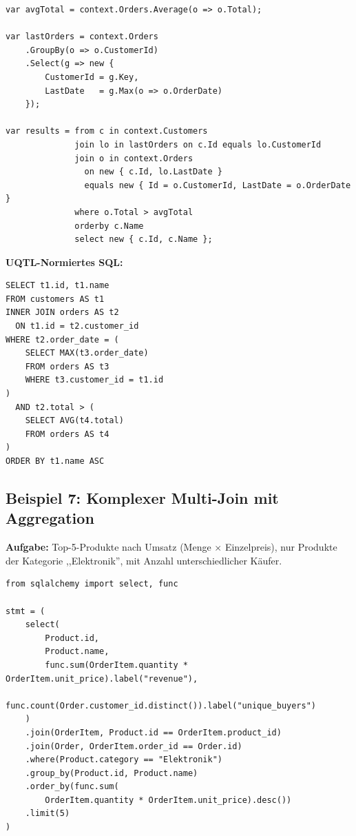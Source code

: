 \begin{lstlisting}[style=csharpstyle, caption={Beispiel 6 -- C\# (Subquery via LINQ)},
  label=lst:bsp6_cs]
var avgTotal = context.Orders.Average(o => o.Total);

var lastOrders = context.Orders
    .GroupBy(o => o.CustomerId)
    .Select(g => new {
        CustomerId = g.Key,
        LastDate   = g.Max(o => o.OrderDate)
    });

var results = from c in context.Customers
              join lo in lastOrders on c.Id equals lo.CustomerId
              join o in context.Orders
                on new { c.Id, lo.LastDate }
                equals new { Id = o.CustomerId, LastDate = o.OrderDate }
              where o.Total > avgTotal
              orderby c.Name
              select new { c.Id, c.Name };
\end{lstlisting}

\begin{successbox}
\textbf{UQTL-Normiertes SQL:}
\begin{lstlisting}[style=sqlstyle, numbers=none]
SELECT t1.id, t1.name
FROM customers AS t1
INNER JOIN orders AS t2
  ON t1.id = t2.customer_id
WHERE t2.order_date = (
    SELECT MAX(t3.order_date)
    FROM orders AS t3
    WHERE t3.customer_id = t1.id
)
  AND t2.total > (
    SELECT AVG(t4.total)
    FROM orders AS t4
)
ORDER BY t1.name ASC
\end{lstlisting}
\end{successbox}

\subsection{Beispiel 7: Komplexer Multi-Join mit Aggregation}
\label{subsec:bsp7}

\textbf{Aufgabe:} Top-5-Produkte nach Umsatz (Menge $\times$ Einzelpreis),
nur Produkte der Kategorie ,,Elektronik'', mit Anzahl unterschiedlicher Käufer.

\begin{lstlisting}[style=pythonstyle, caption={Beispiel 7 -- Python (Multi-Join + Aggregation)},
  label=lst:bsp7_py]
from sqlalchemy import select, func

stmt = (
    select(
        Product.id,
        Product.name,
        func.sum(OrderItem.quantity * OrderItem.unit_price).label("revenue"),
        func.count(Order.customer_id.distinct()).label("unique_buyers")
    )
    .join(OrderItem, Product.id == OrderItem.product_id)
    .join(Order, OrderItem.order_id == Order.id)
    .where(Product.category == "Elektronik")
    .group_by(Product.id, Product.name)
    .order_by(func.sum(
        OrderItem.quantity * OrderItem.unit_price).desc())
    .limit(5)
)
\end{lstlisting}

